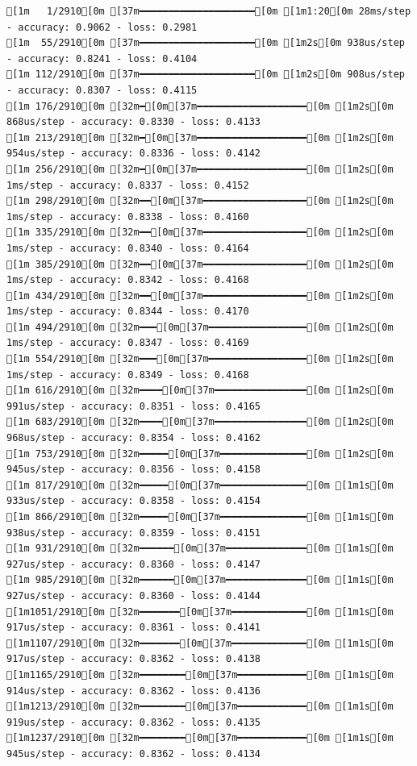 \documentclass[
  letterpaper,
  DIV=11,
  numbers=noendperiod]{scrartcl}
\begin{document}
\begin{verbatim}
[1m   1/2910[0m [37m━━━━━━━━━━━━━━━━━━━━[0m [1m1:20[0m 28ms/step - accuracy: 0.9062 - loss: 0.2981
[1m  55/2910[0m [37m━━━━━━━━━━━━━━━━━━━━[0m [1m2s[0m 938us/step - accuracy: 0.8241 - loss: 0.4104 
[1m 112/2910[0m [37m━━━━━━━━━━━━━━━━━━━━[0m [1m2s[0m 908us/step - accuracy: 0.8307 - loss: 0.4115
[1m 176/2910[0m [32m━[0m[37m━━━━━━━━━━━━━━━━━━━[0m [1m2s[0m 868us/step - accuracy: 0.8330 - loss: 0.4133
[1m 213/2910[0m [32m━[0m[37m━━━━━━━━━━━━━━━━━━━[0m [1m2s[0m 954us/step - accuracy: 0.8336 - loss: 0.4142
[1m 256/2910[0m [32m━[0m[37m━━━━━━━━━━━━━━━━━━━[0m [1m2s[0m 1ms/step - accuracy: 0.8337 - loss: 0.4152  
[1m 298/2910[0m [32m━━[0m[37m━━━━━━━━━━━━━━━━━━[0m [1m2s[0m 1ms/step - accuracy: 0.8338 - loss: 0.4160
[1m 335/2910[0m [32m━━[0m[37m━━━━━━━━━━━━━━━━━━[0m [1m2s[0m 1ms/step - accuracy: 0.8340 - loss: 0.4164
[1m 385/2910[0m [32m━━[0m[37m━━━━━━━━━━━━━━━━━━[0m [1m2s[0m 1ms/step - accuracy: 0.8342 - loss: 0.4168
[1m 434/2910[0m [32m━━[0m[37m━━━━━━━━━━━━━━━━━━[0m [1m2s[0m 1ms/step - accuracy: 0.8344 - loss: 0.4170
[1m 494/2910[0m [32m━━━[0m[37m━━━━━━━━━━━━━━━━━[0m [1m2s[0m 1ms/step - accuracy: 0.8347 - loss: 0.4169
[1m 554/2910[0m [32m━━━[0m[37m━━━━━━━━━━━━━━━━━[0m [1m2s[0m 1ms/step - accuracy: 0.8349 - loss: 0.4168
[1m 616/2910[0m [32m━━━━[0m[37m━━━━━━━━━━━━━━━━[0m [1m2s[0m 991us/step - accuracy: 0.8351 - loss: 0.4165
[1m 683/2910[0m [32m━━━━[0m[37m━━━━━━━━━━━━━━━━[0m [1m2s[0m 968us/step - accuracy: 0.8354 - loss: 0.4162
[1m 753/2910[0m [32m━━━━━[0m[37m━━━━━━━━━━━━━━━[0m [1m2s[0m 945us/step - accuracy: 0.8356 - loss: 0.4158
[1m 817/2910[0m [32m━━━━━[0m[37m━━━━━━━━━━━━━━━[0m [1m1s[0m 933us/step - accuracy: 0.8358 - loss: 0.4154
[1m 866/2910[0m [32m━━━━━[0m[37m━━━━━━━━━━━━━━━[0m [1m1s[0m 938us/step - accuracy: 0.8359 - loss: 0.4151
[1m 931/2910[0m [32m━━━━━━[0m[37m━━━━━━━━━━━━━━[0m [1m1s[0m 927us/step - accuracy: 0.8360 - loss: 0.4147
[1m 985/2910[0m [32m━━━━━━[0m[37m━━━━━━━━━━━━━━[0m [1m1s[0m 927us/step - accuracy: 0.8360 - loss: 0.4144
[1m1051/2910[0m [32m━━━━━━━[0m[37m━━━━━━━━━━━━━[0m [1m1s[0m 917us/step - accuracy: 0.8361 - loss: 0.4141
[1m1107/2910[0m [32m━━━━━━━[0m[37m━━━━━━━━━━━━━[0m [1m1s[0m 917us/step - accuracy: 0.8362 - loss: 0.4138
[1m1165/2910[0m [32m━━━━━━━━[0m[37m━━━━━━━━━━━━[0m [1m1s[0m 914us/step - accuracy: 0.8362 - loss: 0.4136
[1m1213/2910[0m [32m━━━━━━━━[0m[37m━━━━━━━━━━━━[0m [1m1s[0m 919us/step - accuracy: 0.8362 - loss: 0.4135
[1m1237/2910[0m [32m━━━━━━━━[0m[37m━━━━━━━━━━━━[0m [1m1s[0m 945us/step - accuracy: 0.8362 - loss: 0.4134

\end{verbatim}
\end{document}
